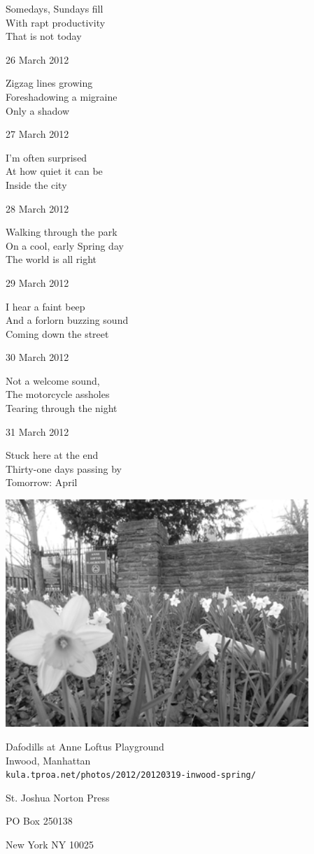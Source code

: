 \documentclass[12pt]{article}
\begin{document}
Somedays, Sundays fill \\
With rapt productivity \\
That is not today

26 March 2012

Zigzag lines growing \\
Foreshadowing a migraine \\
Only a shadow

27 March 2012

I'm often surprised \\
At how quiet it can be \\
Inside the city

28 March 2012

Walking through the park \\
On a cool, early Spring day \\
The world is all right

29 March 2012

I hear a faint beep \\
And a forlorn buzzing sound \\
Coming down the street

30 March 2012

Not a welcome sound, \\
The motorcycle assholes \\
Tearing through the night

31 March 2012

Stuck here at the end \\
Thirty-one days passing by \\
Tomorrow: April

\newpage

\begin{center}
\includegraphics[width=325pt]{inwood.png}

Dafodills at Anne Loftus Playground \\
Inwood, Manhattan \\
{\tt kula.tproa.net/photos/2012/20120319-inwood-spring/ }
\end{center}

\newpage

\thispagestyle{empty}
\vspace*{12cm}
\begin{sideways}
\Large{St. Joshua Norton Press}
\end{sideways}
\begin{sideways}
\Large{PO Box 250138}
\end{sideways}
\begin{sideways}
\Large{New York NY 10025}
\end{sideways}
\end{document}
